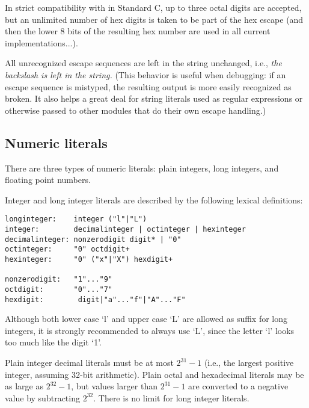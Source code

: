 In strict compatibility with in Standard C, up to three octal digits are
accepted, but an unlimited number of hex digits is taken to be part of
the hex escape (and then the lower 8 bits of the resulting hex number
are used in all current implementations...).

All unrecognized escape sequences are left in the string unchanged,
i.e., {\em the backslash is left in the string.}  (This behavior is
useful when debugging: if an escape sequence is mistyped, the
resulting output is more easily recognized as broken.  It also helps a
great deal for string literals used as regular expressions or
otherwise passed to other modules that do their own escape handling.)

\subsection{Numeric literals}

There are three types of numeric literals: plain integers, long
integers, and floating point numbers.

Integer and long integer literals are described by the following
lexical definitions:

\begin{verbatim}
longinteger:    integer ("l"|"L")
integer:        decimalinteger | octinteger | hexinteger
decimalinteger: nonzerodigit digit* | "0"
octinteger:     "0" octdigit+
hexinteger:     "0" ("x"|"X") hexdigit+

nonzerodigit:   "1"..."9"
octdigit:       "0"..."7"
hexdigit:        digit|"a"..."f"|"A"..."F"
\end{verbatim}

Although both lower case `l' and upper case `L' are allowed as suffix
for long integers, it is strongly recommended to always use `L', since
the letter `l' looks too much like the digit `1'.

Plain integer decimal literals must be at most $2^{31} - 1$ (i.e., the
largest positive integer, assuming 32-bit arithmetic).  Plain octal and
hexadecimal literals may be as large as $2^{32} - 1$, but values
larger than $2^{31} - 1$ are converted to a negative value by
subtracting $2^{32}$.  There is no limit for long integer literals.


